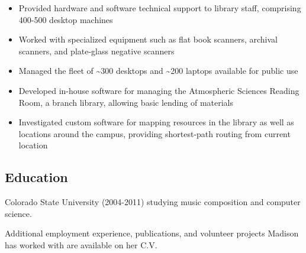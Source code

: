 \documentclass[letterpaper]{memoir}
\begin{document}
\begin{description}
\begin{itemize}
\tightlist
\item
  Provided hardware and software technical support to library staff, comprising 400-500 desktop machines
\item
  Worked with specialized equipment such as flat book scanners, archival scanners, and plate-glass negative scanners
\item
  Managed the fleet of \textasciitilde{}300 desktops and \textasciitilde{}200 laptops available for public use
\item
  Developed in-house software for managing the Atmospheric Sciences Reading Room, a branch library, allowing basic lending of materials
\item
  Investigated custom software for mapping resources in the library as well as locations around the campus, providing shortest-path routing from current location
\end{itemize}
\end{description}

\subsection{Education}\label{education}

\begin{description}
\tightlist
\item[University] \hfill
Colorado State University (2004-2011) studying music composition and
computer science.
\end{description}

Additional employment experience, publications, and volunteer projects
Madison has worked with are available on her C.V.
\end{document}
